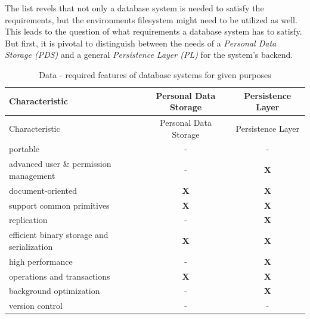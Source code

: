 \documentclass[12pt,english,a4paper,titlepage,cleardoublepage=empty,dottedtoc]{report}
\begin{document}
The list revels that not only a database system is needed to satisfy the
requirements, but the environments filesystem might need to be utilized
as well. This leads to the question of what requirements a database
system has to satisfy. But first, it is pivotal to distinguish between
the needs of a \emph{Personal Data Storage (PDS)} and a general
\emph{Persistence Layer (PL)} for the system's backend.

\begin{longtable}[]{@{}lcc@{}}
\caption{Data - required features of database systems for given purposes
\label{tbl:dbs-features}}\tabularnewline
\toprule
Characteristic & Personal Data Storage & Persistence
Layer\tabularnewline
\midrule
\endfirsthead
\toprule
Characteristic & Personal Data Storage & Persistence
Layer\tabularnewline
\midrule
\endhead
portable & - & -\tabularnewline
advanced user \& permission management & - & \textbf{X}\tabularnewline
document-oriented & \textbf{X} & \textbf{X}\tabularnewline
support common primitives & \textbf{X} & \textbf{X}\tabularnewline
replication & - & \textbf{X}\tabularnewline
efficient binary storage and serialization & \textbf{X} &
\textbf{X}\tabularnewline
high performance & - & \textbf{X}\tabularnewline
operations and transactions & \textbf{X} & \textbf{X}\tabularnewline
background optimization & - & \textbf{X}\tabularnewline
version control & - & -\tabularnewline
\bottomrule
\end{longtable}
\end{document}

